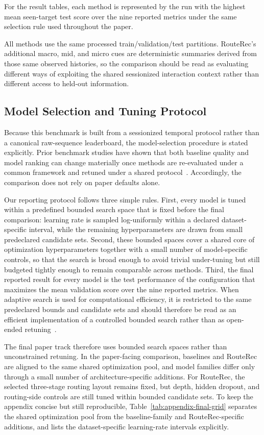 \documentclass[sigconf,review,anonymous]{acmart}
\begin{document}
For the result tables, each method is represented by the run with the highest mean seen-target test score over the nine reported metrics under the same selection rule used throughout the paper.

All methods use the same processed train/validation/test partitions. RouteRec's additional macro, mid, and micro cues are deterministic summaries derived from those same observed histories, so the comparison should be read as evaluating different ways of exploiting the shared sessionized interaction context rather than different access to held-out information.

\subsection{Model Selection and Tuning Protocol}

Because this benchmark is built from a sessionized temporal protocol rather than a canonical raw-sequence leaderboard, the model-selection procedure is stated explicitly. Prior benchmark studies have shown that both baseline quality and model ranking can change materially once methods are re-evaluated under a common framework and retuned under a shared protocol~\cite{latifi2021sessionaware,latifi2022seqstudy}. Accordingly, the comparison does not rely on paper defaults alone.

Our reporting protocol follows three simple rules. First, every model is tuned within a predefined bounded search space that is fixed before the final comparison: learning rate is sampled log-uniformly within a declared dataset-specific interval, while the remaining hyperparameters are drawn from small predeclared candidate sets. Second, these bounded spaces cover a shared core of optimization hyperparameters together with a small number of model-specific controls, so that the search is broad enough to avoid trivial under-tuning but still budgeted tightly enough to remain comparable across methods. Third, the final reported result for every model is the test performance of the configuration that maximizes the mean validation score over the nine reported metrics. When adaptive search is used for computational efficiency, it is restricted to the same predeclared bounds and candidate sets and should therefore be read as an efficient implementation of a controlled bounded search rather than as open-ended retuning~\cite{galuzzi2020bayesopt}.

The final paper track therefore uses bounded search spaces rather than unconstrained retuning. In the paper-facing comparison, baselines and RouteRec are aligned to the same shared optimization pool, and model families differ only through a small number of architecture-specific additions. For RouteRec, the selected three-stage routing layout remains fixed, but depth, hidden dropout, and routing-side controls are still tuned within bounded candidate sets. To keep the appendix concise but still reproducible, Table~\ref{tab:appendix-final-grid} separates the shared optimization pool from the baseline-family and RouteRec-specific additions, and lists the dataset-specific learning-rate intervals explicitly.
\end{document}
